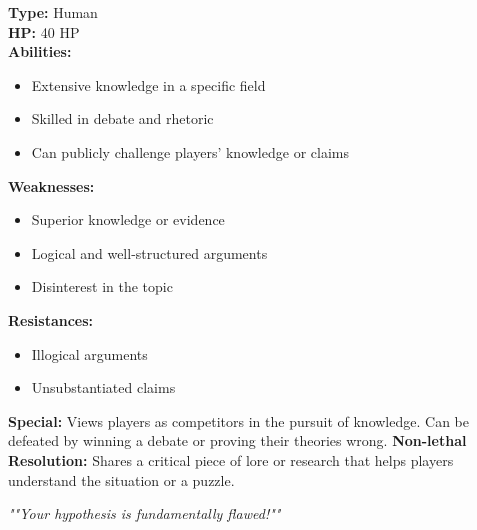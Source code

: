 \documentclass{article}
\newcommand{\monstercard}[8]{%
    \begin{tcolorbox}[
        width=5.8cm, %
        colback=boxcontentbg,
        colframe=boxborder,
        coltitle=boxheaderfg,
        colbacktitle=boxheaderbg,
        fonttitle=\bfseries\sffamily\large,
        title=#1, %
        arc=10pt, %
        boxrule=2pt, %
        left=3mm,
        right=3mm,
        top=2mm,
        bottom=2mm,
        enhanced,
        nobeforeafter,
    ]%
        \textbf{Type:} #2\\
        \textbf{HP:} #3\\
        \vspace{0.1cm} %
        \textbf{Abilities:}
        \begin{itemize}[nosep, leftmargin=*, itemsep=0pt, topsep=0pt, parsep=0pt, partopsep=0pt]
            #4
        \end{itemize}
        \vspace{0.1cm} %
        \textbf{Weaknesses:}
        \begin{itemize}[nosep, leftmargin=*, itemsep=0pt, topsep=0pt, parsep=0pt, partopsep=0pt]
            #5
        \end{itemize}
         \vspace{0.1cm} %
        \textbf{Resistances:}
        \begin{itemize}[nosep, leftmargin=*, itemsep=0pt, topsep=0pt, parsep=0pt, partopsep=0pt]
            #6
        \end{itemize}
         \vspace{0.1cm} %
        \textbf{Special:} #7
        
        \vspace{0.3cm} %
        \centering\itshape "#8"%
    \end{tcolorbox}%
}%
\begin{document}
\vspace{1cm} %

\noindent %
\begin{minipage}[t]{.48\textwidth}
\monstercard{Academic Rival}
{Human}
{40 HP}
{\item Extensive knowledge in a specific field\\
\item Skilled in debate and rhetoric\\
\item Can publicly challenge players' knowledge or claims}
{\item Superior knowledge or evidence\\
\item Logical and well-structured arguments\\
\item Disinterest in the topic}
{\item Illogical arguments\\
\item Unsubstantiated claims}
{Views players as competitors in the pursuit of knowledge. Can be defeated by winning a debate or proving their theories wrong. \textbf{Non-lethal Resolution:} Shares a critical piece of lore or research that helps players understand the situation or a puzzle.}
{"Your hypothesis is fundamentally flawed!"}
\end{minipage}
\end{document}
